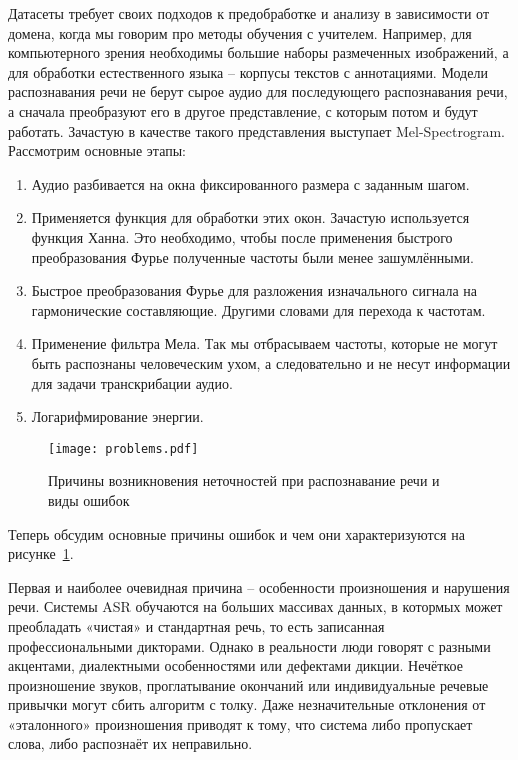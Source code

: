 Датасеты требует своих подходов к предобработке и анализу в зависимости от домена, когда мы говорим про методы обучения с учителем.
Например, для компьютерного зрения необходимы большие наборы размеченных изображений, а для обработки естественного языка -- корпусы текстов с аннотациями.
Модели распознавания речи не берут сырое аудио для последующего распознавания речи, а сначала преобразуют его в другое представление, с которым потом и будут работать\cite{hannun2014deep,amodei2016deep}.
Зачастую в качестве такого представления выступает Mel-Spectrogram.
Рассмотрим основные этапы:
\begin{enumerate}
  \item Аудио разбивается на окна фиксированного размера с заданным шагом.
  \item Применяется функция для обработки этих окон.
  Зачастую используется функция Ханна.
  Это необходимо, чтобы после применения быстрого преобразования Фурье полученные частоты были менее зашумлёнными.
  \item Быстрое преобразования Фурье\cite{Heideman1984} для разложения изначального сигнала на гармонические составляющие.
  Другими словами для перехода к частотам.
  \item Применение фильтра Мела.
  Так мы отбрасываем частоты, которые не могут быть распознаны человеческим ухом, а следовательно и не несут информации для задачи транскрибации аудио.
  \item Логарифмирование энергии.
\end{enumerate}

\begin{figure}[!t]
  \centering
  \texttt{[image: problems.pdf]}
  \caption{Причины возникновения неточностей при распознавание речи и виды ошибок}
  \label{fig:problems}
\end{figure}

Теперь обсудим основные причины ошибок и чем они характеризуются на рисунке~\ref{fig:problems}.

Первая и наиболее очевидная причина -- особенности произношения и нарушения речи.
Системы ASR обучаются на больших массивах данных, в котормых может преобладать «чистая» и стандартная речь, то есть записанная профессиональными дикторами.
Однако в реальности люди говорят с разными акцентами, диалектными особенностями или дефектами дикции.
Нечёткое произношение звуков, проглатывание окончаний или индивидуальные речевые привычки могут сбить алгоритм с толку.
Даже незначительные отклонения от «эталонного» произношения приводят к тому, что система либо пропускает слова, либо распознаёт их неправильно.

